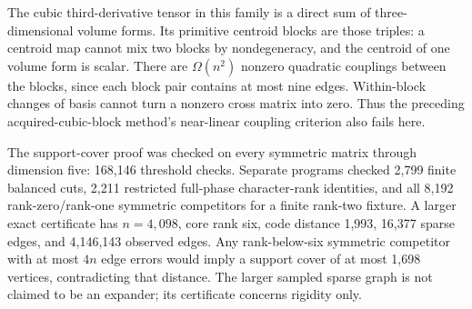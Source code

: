 \documentclass[11pt,a4paper]{article}
\theoremstyle{remark}\newtheorem{remark}[theorem]{Remark}
\begin{document}
The cubic third-derivative tensor in this family is a
direct sum of three-dimensional volume forms. Its
primitive centroid blocks are those triples: a
centroid map cannot mix two blocks by nondegeneracy,
and the centroid of one volume form is scalar.
There are $\Omega(n^2)$ nonzero quadratic couplings
between the blocks, since each block pair contains
at most nine edges. Within-block changes of basis
cannot turn a nonzero cross matrix into zero.
Thus the preceding acquired-cubic-block method's
near-linear coupling criterion also fails here.

The support-cover proof was checked on every symmetric
matrix through dimension five: 168,146 threshold checks.
Separate programs checked 2,799 finite balanced cuts,
2,211 restricted full-phase character-rank identities,
and all 8,192 rank-zero/rank-one symmetric competitors
for a finite rank-two fixture. A larger exact certificate
has $n=4,098$, core rank six, code distance 1,993,
16,377 sparse edges, and 4,146,143 observed edges.
Any rank-below-six symmetric competitor with at most
$4n$ edge errors would imply a support cover of at
most 1,698 vertices, contradicting that distance.
The larger sampled sparse graph is not claimed to
be an expander; its certificate concerns rigidity only.
\end{document}
